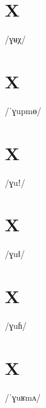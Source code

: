 \documentclass[10pt,a4paper,twoside]{book}
\begin{document}
\section*{X}

\begin{multicols}{3}
 {/ɣʉχ/} {}
\end{multicols}

\section*{X}

\begin{multicols}{3}
 {/ˈɣupmɵ/} {}
\end{multicols}

\section*{X}

\begin{multicols}{3}
 {/ɣuǃ/} {}
\end{multicols}

\section*{X}

\begin{multicols}{3}
 {/ɣuǁ/} {}
\end{multicols}

\section*{X}

\begin{multicols}{3}
 {/ɣuɦ/} {}
\end{multicols}

\section*{X}

\begin{multicols}{3}
 {/ˈɣuʁmʌ/} {}
\end{multicols}
\end{document}
